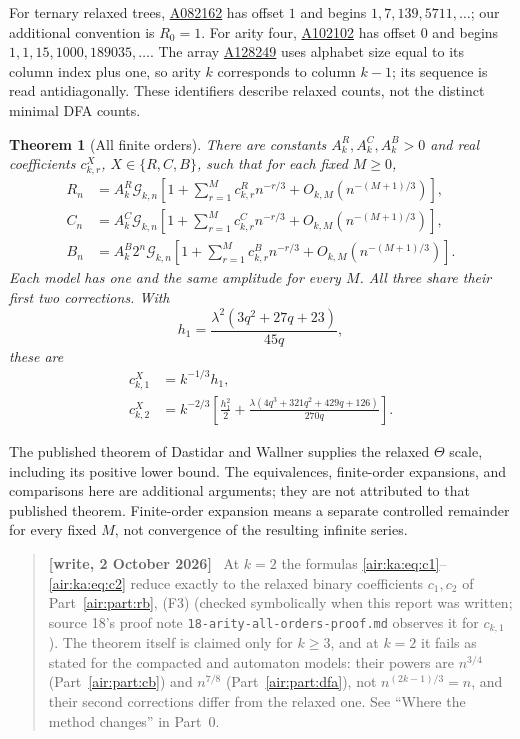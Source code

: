 \documentclass[11pt,letterpaper]{article}
\numberwithin{equation}{section}
\newtheorem{theorem}{Theorem}[section]
\theoremstyle{remark}
\newcommand{\G}{\mathcal G}
\newenvironment{writenote}{\par\smallskip\begin{quote}\small\textbf{[write, 2 October 2026]}\ }{\end{quote}\smallskip}
\newcommand{\repopath}[1]{\nolinkurl{#1}}
\begin{document}
For ternary relaxed trees, \href{https://oeis.org/A082162}{A082162} has offset $1$ and begins $1,7,139,5711,\ldots$; our additional convention is $R_0=1$. For arity four, \href{https://oeis.org/A102102}{A102102} has offset $0$ and begins $1,1,15,1000,189035,\ldots$. The array \href{https://oeis.org/A128249}{A128249} uses alphabet size equal to its column index plus one, so arity $k$ corresponds to column $k-1$; its sequence is read antidiagonally. These identifiers describe relaxed counts, not the distinct minimal DFA counts.

\begin{theorem}[All finite orders]\label{air:ka:thm:all}
There are constants $A_k^R,A_k^C,A_k^B>0$ and real coefficients $c_{k,r}^X$, $X\in\{R,C,B\}$, such that for each fixed $M\ge0$,
\begin{align}
 R_n&=A_k^R\G_{k,n}\left[1+\sum_{r=1}^M c_{k,r}^R n^{-r/3}
 +O_{k,M}(n^{-(M+1)/3})\right],\\
 C_n&=A_k^C\G_{k,n}\left[1+\sum_{r=1}^M c_{k,r}^C n^{-r/3}
 +O_{k,M}(n^{-(M+1)/3})\right],\\
 B_n&=A_k^B2^n\G_{k,n}\left[1+\sum_{r=1}^M c_{k,r}^B n^{-r/3}
 +O_{k,M}(n^{-(M+1)/3})\right].
\end{align}
Each model has one and the same amplitude for every $M$. All three share their first two corrections. With
\begin{equation}\label{air:ka:eq:h1}
 h_1=\frac{\lambda^2(3q^2+27q+23)}{45q},
\end{equation}
these are
\begin{align}
 c_{k,1}^X&=k^{-1/3}h_1,\label{air:ka:eq:c1}\\
 c_{k,2}^X&=k^{-2/3}\left[\frac{h_1^2}{2}
 +\frac{\lambda(4q^3+321q^2+429q+126)}{270q}\right].\label{air:ka:eq:c2}
\end{align}
\end{theorem}

The published theorem of Dastidar and Wallner \cite{gdw} supplies the relaxed $\Theta$ scale, including its positive lower bound. The equivalences, finite-order expansions, and comparisons here are additional arguments; they are not attributed to that published theorem. Finite-order expansion means a separate controlled remainder for every fixed $M$, not convergence of the resulting infinite series.
\begin{writenote}
At $k=2$ the formulas \eqref{air:ka:eq:c1}--\eqref{air:ka:eq:c2} reduce exactly to the relaxed binary coefficients $c_1,c_2$ of Part~\ref{air:part:rb}, (F3) (checked symbolically when this report was written; source 18's proof note \repopath{18-arity-all-orders-proof.md} observes it for $c_{k,1}$). The theorem itself is claimed only for $k\ge3$, and at $k=2$ it fails as stated for the compacted and automaton models: their powers are $n^{3/4}$ (Part~\ref{air:part:cb}) and $n^{7/8}$ (Part~\ref{air:part:dfa}), not $n^{(2k-1)/3}=n$, and their second corrections differ from the relaxed one. See ``Where the method changes'' in Part~0.
\end{writenote}
\end{document}

